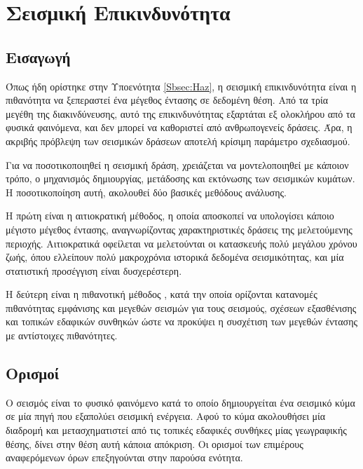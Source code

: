 \newpage
\pagestyle{fancy}

\chapter{Σεισμική Επικινδυνότητα}
\label{Ch:haz}
\section{Εισαγωγή}
Όπως ήδη ορίστηκε στην Υποενότητα \ref{Sbsec:Haz}, η σεισμική επικινδυνότητα είναι η πιθανότητα  να ξεπεραστεί ένα μέγεθος έντασης σε δεδομένη θέση. Από τα τρία μεγέθη της διακινδύνευσης, αυτό της επικινδυνότητας εξαρτάται εξ ολοκλήρου από τα φυσικά φαινόμενα, και δεν μπορεί να καθοριστεί από ανθρωπογενείς δράσεις. Άρα, η ακριβής πρόβλεψη των σεισμικών δράσεων αποτελή κρίσιμη παράμετρο σχεδιασμού.

Για να ποσοτικοποιηθεί η σεισμική δράση, χρειάζεται να μοντελοποιηθεί με κάποιον τρόπο, ο μηχανισμός δημιουργίας, μετάδοσης και εκτόνωσης των σεισμικών κυμάτων. Η ποσοτικοποίηση αυτή, ακολουθεί δύο βασικές μεθόδους ανάλυσης.

Η πρώτη είναι η αιτιοκρατική μέθοδος, η οποία αποσκοπεί να υπολογίσει κάποιο μέγιστο μέγεθος έντασης, αναγνωρίζοντας χαρακτηριστικές δράσεις της μελετούμενης περιοχής. Αιτιοκρατικά οφείλεται να μελετούνται οι κατασκευής πολύ μεγάλου χρόνου ζωής, όπου ελλείπουν πολύ μακροχρόνια ιστορικά δεδομένα σεισμικότητας, και μία στατιστική προσέγγιση είναι δυσχερέστερη.

Η δεύτερη είναι η πιθανοτική μέθοδος \parencite{Cornell, McGuire}, κατά την οποία ορίζονται κατανομές πιθανότητας εμφάνισης και μεγεθών σεισμών για τους σεισμούς, σχέσεων εξασθένισης και τοπικών εδαφικών συνθηκών ώστε να προκύψει η συσχέτιση των μεγεθών έντασης με αντίστοιχες πιθανότητες.


\section{Ορισμοί}
Ο σεισμός είναι το φυσικό φαινόμενο κατά το οποίο δημιουργείται ένα σεισμικό κύμα σε μία πηγή που εξαπολύει σεισμική ενέργεια. Αφού το κύμα ακολουθήσει μία διαδρομή και μετασχηματιστεί από τις τοπικές εδαφικές συνθήκες μίας γεωγραφικής θέσης, δίνει στην θέση αυτή κάποια απόκριση. Οι ορισμοί των επιμέρους αναφερόμενων όρων επεξηγούνται στην παρούσα ενότητα.

